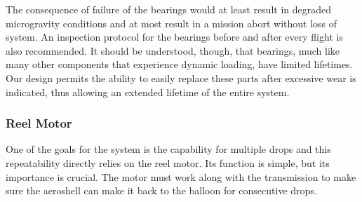 The consequence of failure of the bearings would at least result in degraded microgravity conditions and at most result in a mission abort without loss of system. An inspection protocol for the bearings before and after every flight is also recommended. It should be understood, though, that bearings, much like many other components that experience dynamic loading, have limited lifetimes. Our design permits the ability to easily replace these parts after excessive wear is indicated, thus allowing an extended lifetime of the entire system. 


\subsubsection{Reel Motor}

\indent\indent One of the goals for the system is the capability for multiple drops and this repeatability directly relies on the reel motor. Its function is simple, but its importance is crucial. The motor must work along with the transmission to make sure the aeroshell can make it back to the balloon for consecutive drops.

